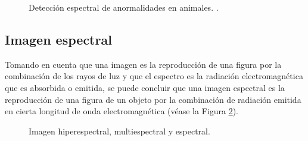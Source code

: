 \begin{figure}[h]
  \centering
  \centering
  \caption{Detección espectral de anormalidades en animales. \cite{animal}.}
  \label{fAnimal}
\end{figure}
\subsection{Imagen espectral}
Tomando en cuenta que una imagen es la reproducción de una figura por la combinación de los rayos de luz y que el espectro es la radiación electromagnética que es absorbida o emitida, se puede concluir que una imagen espectral es la reproducción de una figura de un objeto por la combinación de radiación emitida en cierta longitud de onda electromagnética (véase la Figura \ref{fWiki}).

\begin{figure}[h]
  \centering
  \centering
  \caption{Imagen hiperespectral, multiespectral y espectral.}
  \label{fWiki}
\end{figure}

